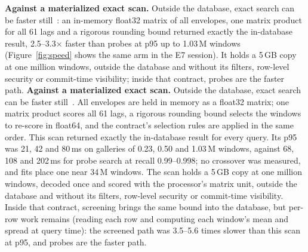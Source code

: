 \documentclass[sigconf]{acmart}
\begin{document}
\ifdefined\SigmodSubmission \textbf{Against a materialized exact scan.} Outside the database, exact search can be faster still~\cite{e3,e4}: an in-memory float32 matrix of all envelopes, one matrix product for all 61 lags and a rigorous rounding bound returned exactly the in-database result, 2.5--3.3$\times$ faster than probes at p95 up to 1.03\,M windows (Figure~\ref{fig:speed} shows the same arm in the E7 session). It holds a 5\,GB copy at one million windows, outside the database and without its filters, row-level security or commit-time visibility; inside that contract, probes are the faster path.\else
\textbf{Against a materialized exact scan.} Outside the database, exact search can be faster still~\cite{e3,e4}. All envelopes are held in memory as a float32 matrix; one matrix product scores all 61 lags, a rigorous rounding bound selects the windows to re-score in float64, and the contract's selection rules are applied in the same order. This scan returned exactly the in-database result for every query. Its p95 was 21, 42 and 80\,ms on galleries of 0.23, 0.50 and 1.03\,M windows, against 68, 108 and 202\,ms for probe search at recall 0.99--0.998; no crossover was measured, and fits place one near 34\,M windows. The scan holds a 5\,GB copy at one million windows, decoded once and scored with the processor's matrix unit, outside the database and without its filters, row-level security or commit-time visibility. Inside that contract, screening brings the same bound into the database, but per-row work remains (reading each row and computing each window's mean and spread at query time): the screened path was 3.5--5.6 times slower than this scan at p95, and probes are the faster path.
\fi

\begin{table}[t]
\caption{E1: recall@10 by candidate generator. All arms re-rank with $D$.}
\label{tab:ablation}
\small\setlength{\tabcolsep}{3pt}

\end{table}
\end{document}
